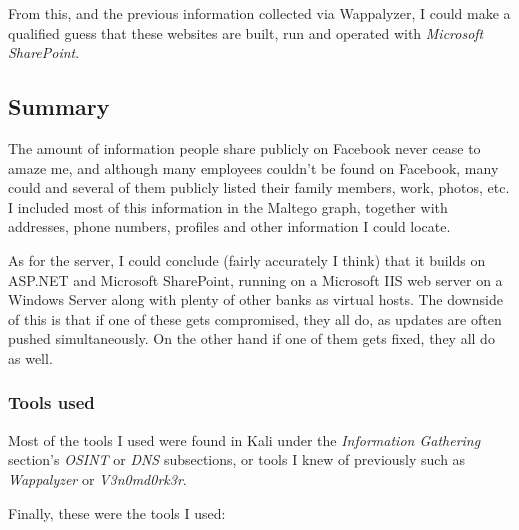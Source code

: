 From this, and the previous information collected via Wappalyzer, I could make a qualified guess that these websites are built, run and operated with \textit{Microsoft SharePoint}.

\subsection{Summary}
The amount of information people share publicly on Facebook never cease to amaze me, and although many employees couldn't be found on Facebook, many could and several of them publicly listed their family members, work, photos, etc. I included most of this information in the Maltego graph, together with addresses, phone numbers, profiles and other information I could locate.

As for the server, I could conclude (fairly accurately I think) that it builds on ASP.NET and Microsoft SharePoint, running on a Microsoft IIS web server on a Windows Server along with plenty of other banks as virtual hosts. The downside of this is that if one of these gets compromised, they all do, as updates are often pushed simultaneously. On the other hand if one of them gets fixed, they all do as well. 

\subsubsection{Tools used}

Most of the tools I used were found in Kali under the \textit{Information Gathering} section's \textit{OSINT} or \textit{DNS} subsections, or tools I knew of previously such as \textit{Wappalyzer} or \textit{V3n0md0rk3r}.

Finally, these were the tools I used:

